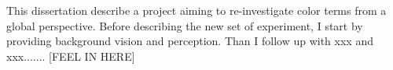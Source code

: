 This dissertation describe a project aiming to re-investigate color terms from a global perspective. Before describing the new set of experiment, I start by providing background vision and perception. Than I follow up with xxx and xxx....... [FEEL IN HERE]














